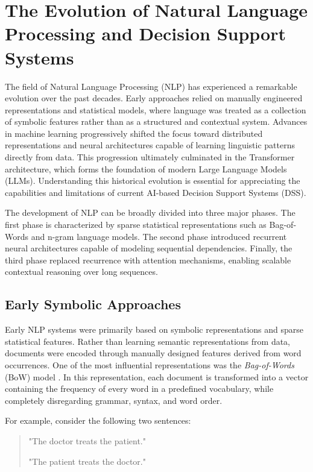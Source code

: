 \chapter{The Evolution of Natural Language Processing and Decision Support Systems}
\label{sec:evolution_llm}

The field of Natural Language Processing (NLP) has experienced a remarkable evolution over the past decades. Early approaches relied on manually engineered representations and statistical models, where language was treated as a collection of symbolic features rather than as a structured and contextual system. Advances in machine learning progressively shifted the focus toward distributed representations and neural architectures capable of learning linguistic patterns directly from data. This progression ultimately culminated in the Transformer architecture, which forms the foundation of modern Large Language Models (LLMs). Understanding this historical evolution is essential for appreciating the capabilities and limitations of current AI-based Decision Support Systems (DSS).

The development of NLP can be broadly divided into three major phases. The first phase is characterized by sparse statistical representations such as Bag-of-Words and n-gram language models. The second phase introduced recurrent neural architectures capable of modeling sequential dependencies. Finally, the third phase replaced recurrence with attention mechanisms, enabling scalable contextual reasoning over long sequences.


\section{Early Symbolic Approaches}

Early NLP systems were primarily based on symbolic representations and sparse statistical features. Rather than learning semantic representations from data, documents were encoded through manually designed features derived from word occurrences. One of the most influential representations was the \textit{Bag-of-Words} (BoW) model \cite{manning2008introduction, qader2019overview}. In this representation, each document is transformed into a vector containing the frequency of every word in a predefined vocabulary, while completely disregarding grammar, syntax, and word order.

For example, consider the following two sentences:

\begin{quote}
"The doctor treats the patient."

"The patient treats the doctor."
\end{quote}

